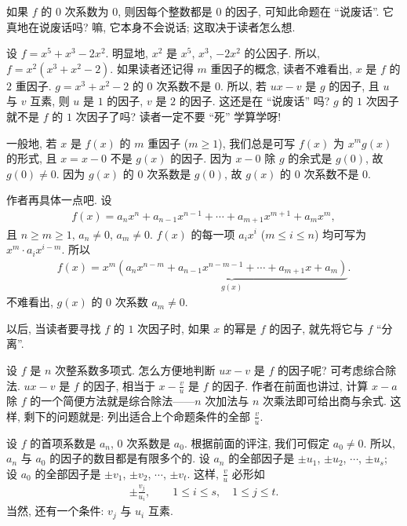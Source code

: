 \begin{remark}
    如果 $f$ 的 $0$ 次系数为 $0$, 则因每个整数都是 $0$ 的因子, 可知此命题在 ``说废话''. 它真地在说废话吗? 嘛, 它本身不会说话; 这取决于读者怎么想.

    设 $f = x^5 + x^3 - 2x^2$. 明显地, $x^2$ 是 $x^5$, $x^3$, $-2x^2$ 的公因子. 所以, $f = x^2 (x^3 + x^2 - 2)$. 如果读者还记得 $m$ 重因子的概念, 读者不难看出, $x$ 是 $f$ 的 $2$ 重因子. $g = x^3 + x^2 - 2$ 的 $0$ 次系数不是 $0$. 所以, 若 $ux - v$ 是 $g$ 的因子, 且 $u$ 与 $v$ 互素, 则 $u$ 是 $1$ 的因子, $v$ 是 $2$ 的因子. 这还是在 ``说废话'' 吗? $g$ 的 $1$ 次因子就不是 $f$ 的 $1$ 次因子了吗? 读者一定不要 ``死'' 学算学呀!

    一般地, 若 $x$ 是 $f(x)$ 的 $m$ 重因子 ($m \geq 1$), 我们总是可写 $f(x)$ 为 $x^m g(x)$ 的形式, 且 $x = x - 0$ 不是 $g(x)$ 的因子. 因为 $x - 0$ 除 $g$ 的余式是 $g(0)$, 故 $g(0) \neq 0$. 因为 $g(x)$ 的 $0$ 次系数是 $g(0)$, 故 $g(x)$ 的 $0$ 次系数不是 $0$.

    作者再具体一点吧. 设
    \begin{align*}
        f(x) = a_n x^n + a_{n-1} x^{n-1} + \cdots + a_{m+1} x^{m+1} + a_m x^m,
    \end{align*}
    且 $n \geq m \geq 1$, $a_n \neq 0$, $a_m \neq 0$. $f(x)$ 的每一项 $a_i x^i$ ($m \leq i \leq n$) 均可写为 $x^m \cdot a_i x^{i-m}$. 所以
    \begin{align*}
        f(x) = x^m \underbrace{(a_n x^{n-m} + a_{n-1} x^{n-m-1} + \cdots + a_{m+1} x + a_m)}_{g(x)}.
    \end{align*}
    不难看出, $g(x)$ 的 $0$ 次系数 $a_m \neq 0$.

    以后, 当读者要寻找 $f$ 的 $1$ 次因子时, 如果 $x$ 的幂是 $f$ 的因子, 就先将它与 $f$ ``分离''.
\end{remark}

设 $f$ 是 $n$ 次整系数多项式. 怎么方便地判断 $ux - v$ 是 $f$ 的因子呢? 可考虑综合除法. $ux - v$ 是 $f$ 的因子, 相当于 $x - \frac{v}{u}$ 是 $f$ 的因子. 作者在前面也讲过, 计算 $x - a$ 除 $f$ 的一个简便方法就是综合除法——$n$ 次加法与 $n$ 次乘法即可给出商与余式. 这样, 剩下的问题就是: 列出适合上个命题条件的全部 $\frac{v}{u}$.

设 $f$ 的首项系数是 $a_n$, $0$ 次系数是 $a_0$. 根据前面的评注, 我们可假定 $a_0 \neq 0$. 所以, $a_n$ 与 $a_0$ 的因子的数目都是有限多个的. 设 $a_n$ 的全部因子是 $\pm u_1$, $\pm u_2$, $\cdots$, $\pm u_s$; 设 $a_0$ 的全部因子是 $\pm v_1$, $\pm v_2$, $\cdots$, $\pm v_t$. 这样, $\frac{v}{u}$ 必形如
\begin{align*}
    \pm \frac{v_j}{u_i}, \qquad 1 \leq i \leq s, \quad 1 \leq j \leq t.
\end{align*}
当然, 还有一个条件: $v_j$ 与 $u_i$ 互素.

